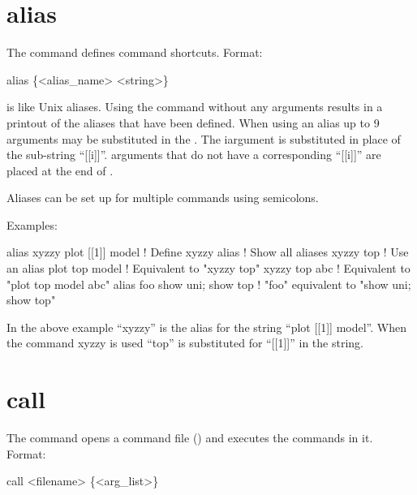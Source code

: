 
\vfil
\break

\section{alias}
\label{s:alias}

The  command defines command shortcuts. Format:
\begin{example}
  alias \{<alias_name> <string>\}
\end{example}

\vskip 0.2in

 is like Unix aliases. Using the  command without
any arguments results in a printout of the aliases that have been
defined. When using an alias up to 9 arguments may be substituted in
the . The i\Th argument is substituted in place of the
sub-string ``[[i]]''.  arguments that do not have a corresponding
``[[i]]'' are placed at the end of .

Aliases can be set up for multiple commands using semicolons.

Examples:
\begin{example}
    alias xyzzy plot [[1]] model  ! Define xyzzy
    alias                         ! Show all aliases
    xyzzy top                     ! Use an alias
    plot top model                ! Equivalent to "xyzzy top"
    xyzzy top abc                 ! Equivalent to "plot top model abc"
    alias foo  show uni; show top ! "foo" equivalent to "show uni; show top"
\end{example}
In the above example ``xyzzy'' is the alias for the string ``plot [[1]]
model''.  When the command xyzzy is used ``top'' is substituted
for ``[[1]]'' in the string.

\section{call}
\label{s:call}

The  command opens a command file () and
executes the commands in it. 
Format:
\begin{example}
  call <filename> \{<arg_list>\}  \Strut
\end{example}

